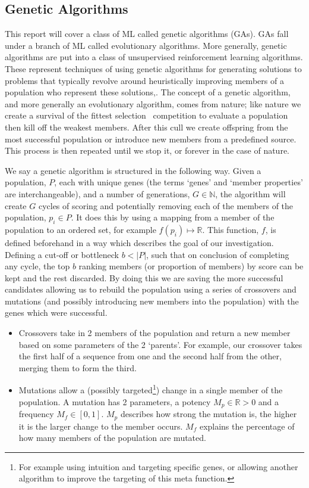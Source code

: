 \subsection{Genetic Algorithms}\label{subsec:geneticAlgorithms}
This report will cover a class of ML called genetic algorithms (GAs).
GAs fall under a branch of ML called evolutionary algorithms.
More generally, genetic algorithms are put into a class of unsupervised reinforcement learning algorithms.
These represent techniques of using genetic algorithms for generating solutions to problems that typically revolve around heuristically improving members of a population who represent these solutions,\cite{horn1994niched,rahmat1999electromagnetic}.
The concept of a genetic algorithm, and more generally an evolutionary algorithm, comes from nature;
like nature we create a survival of the fittest selection~\cite{darwin2009origin} competition to evaluate a population then kill off the weakest members.
After this cull we create offspring from the most successful population or introduce new members from a predefined source.
This process is then repeated until we stop it, or forever in the case of nature.

We say a genetic algorithm is structured in the following way.
Given a population, \(P\), each with unique genes (the terms `genes' and `member properties' are interchangeable), and a number of generations, \(G\in \mathbb{N}\), the algorithm will create \(G\) cycles of scoring and potentially removing each of the members of the population, \(p_i \in P\).
It does this by using a mapping from a member of the population to an ordered set, for example \(f(p_i)\mapsto \mathbb{R}\).
This function, \(f\), is defined beforehand in a way which describes the goal of our investigation.
Defining a cut-off or bottleneck \(b<|P|\), such that on conclusion of completing any cycle, the top \(b\) ranking members (or proportion of members) by score can be kept and the rest discarded.
By doing this we are saving the more successful candidates allowing us to rebuild the population using a series of crossovers and mutations (and possibly introducing new members into the population) with the genes which were successful.

\begin{itemize}
    \item Crossovers take in 2 members of the population and return a new member based on some parameters of the 2 `parents'.
    For example, our crossover takes the first half of a sequence from one and the second half from the other, merging them to form the third.
    \item Mutations allow a (possibly targeted\footnote{For example using intuition and targeting specific genes, or allowing another algorithm to improve the targeting of this meta function.}) change in a single member of the population.
    A mutation has 2 parameters, a potency \(M_p\in \mathbb{R}>0\) and a frequency \(M_f\in [0,1]\).
    \(M_p\) describes how strong the mutation is, the higher it is the larger change to the member occurs.
    \(M_f\) explains the percentage of how many members of the population are mutated.
\end{itemize}

